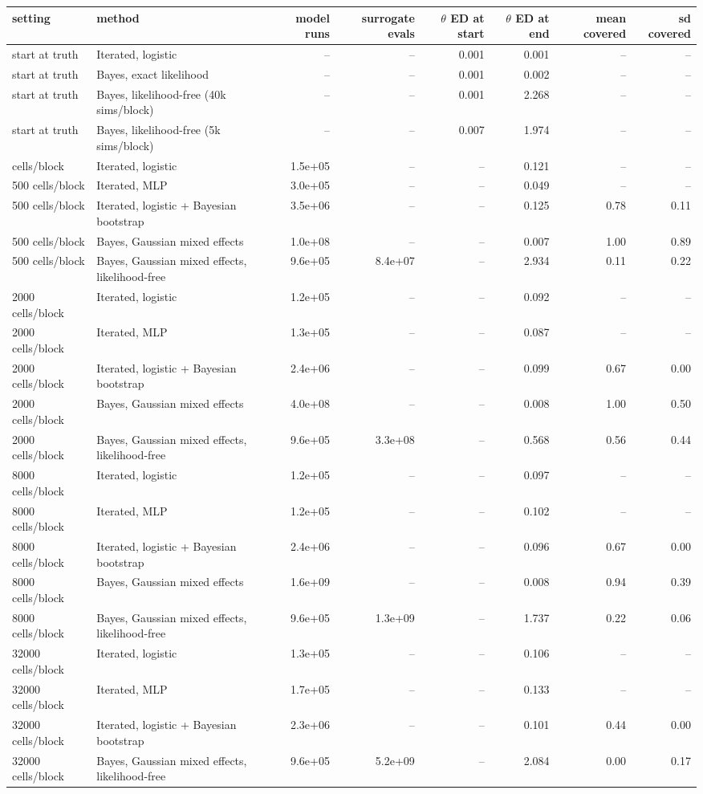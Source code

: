 \begin{tabular}{llrrrrrr}
\toprule
setting & method & model runs & surrogate evals & $\theta$ ED at start & $\theta$ ED at end & mean covered & sd covered \\
\midrule
start at truth & Iterated, logistic & -- & -- & 0.001 & 0.001 & -- & -- \\
start at truth & Bayes, exact likelihood & -- & -- & 0.001 & 0.002 & -- & -- \\
start at truth & Bayes, likelihood-free (40k sims/block) & -- & -- & 0.001 & 2.268 & -- & -- \\
start at truth & Bayes, likelihood-free (5k sims/block) & -- & -- & 0.007 & 1.974 & -- & -- \\ \addlinespace
500 cells/block & Iterated, logistic & 1.5e+05 & -- & -- & 0.121 & -- & -- \\
500 cells/block & Iterated, MLP & 3.0e+05 & -- & -- & 0.049 & -- & -- \\
500 cells/block & Iterated, logistic + Bayesian bootstrap & 3.5e+06 & -- & -- & 0.125 & 0.78 & 0.11 \\
500 cells/block & Bayes, Gaussian mixed effects & 1.0e+08 & -- & -- & 0.007 & 1.00 & 0.89 \\
500 cells/block & Bayes, Gaussian mixed effects, likelihood-free & 9.6e+05 & 8.4e+07 & -- & 2.934 & 0.11 & 0.22 \\
2000 cells/block & Iterated, logistic & 1.2e+05 & -- & -- & 0.092 & -- & -- \\
2000 cells/block & Iterated, MLP & 1.3e+05 & -- & -- & 0.087 & -- & -- \\
2000 cells/block & Iterated, logistic + Bayesian bootstrap & 2.4e+06 & -- & -- & 0.099 & 0.67 & 0.00 \\
2000 cells/block & Bayes, Gaussian mixed effects & 4.0e+08 & -- & -- & 0.008 & 1.00 & 0.50 \\
2000 cells/block & Bayes, Gaussian mixed effects, likelihood-free & 9.6e+05 & 3.3e+08 & -- & 0.568 & 0.56 & 0.44 \\
8000 cells/block & Iterated, logistic & 1.2e+05 & -- & -- & 0.097 & -- & -- \\
8000 cells/block & Iterated, MLP & 1.2e+05 & -- & -- & 0.102 & -- & -- \\
8000 cells/block & Iterated, logistic + Bayesian bootstrap & 2.4e+06 & -- & -- & 0.096 & 0.67 & 0.00 \\
8000 cells/block & Bayes, Gaussian mixed effects & 1.6e+09 & -- & -- & 0.008 & 0.94 & 0.39 \\
8000 cells/block & Bayes, Gaussian mixed effects, likelihood-free & 9.6e+05 & 1.3e+09 & -- & 1.737 & 0.22 & 0.06 \\
32000 cells/block & Iterated, logistic & 1.3e+05 & -- & -- & 0.106 & -- & -- \\
32000 cells/block & Iterated, MLP & 1.7e+05 & -- & -- & 0.133 & -- & -- \\
32000 cells/block & Iterated, logistic + Bayesian bootstrap & 2.3e+06 & -- & -- & 0.101 & 0.44 & 0.00 \\
32000 cells/block & Bayes, Gaussian mixed effects, likelihood-free & 9.6e+05 & 5.2e+09 & -- & 2.084 & 0.00 & 0.17 \\
\bottomrule
\end{tabular}
